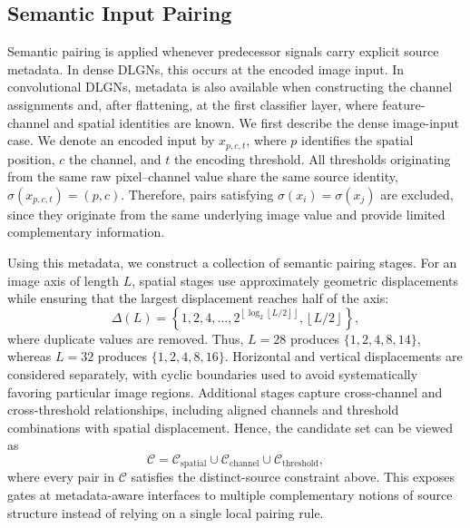 \subsection{Semantic Input Pairing}
\label{sec:semantic}

Semantic pairing is applied whenever predecessor signals carry explicit
source metadata. In dense DLGNs, this occurs at the encoded image input. In
convolutional DLGNs, metadata is also available when constructing the
channel assignments and, after flattening, at the first classifier layer,
where feature-channel and spatial identities are known. We first describe
the dense image-input case. We denote an encoded input by $x_{p,c,t}$, where
$p$ identifies the spatial position, $c$ the channel, and $t$ the encoding
threshold. All thresholds originating from the same raw pixel--channel value
share the same source identity, $\sigma(x_{p,c,t})=(p,c)$. Therefore, pairs
satisfying $\sigma(x_i)=\sigma(x_j)$ are excluded, since they originate from
the same underlying image value and provide limited complementary
information.

Using this metadata, we construct a collection of semantic pairing stages.
For an image axis of length $L$, spatial stages use approximately geometric
displacements while ensuring that the largest displacement reaches half of
the axis:
%
\begin{equation}
\Delta(L)=
\left\{
1,2,4,\ldots,
2^{\left\lfloor\log_2 \left\lfloor L/2\right\rfloor\right\rfloor},
\left\lfloor L/2\right\rfloor
\right\},
\label{eq:semantic_stride}
\end{equation}
%
where duplicate values are removed. Thus, $L=28$ produces
$\{1,2,4,8,14\}$, whereas $L=32$ produces $\{1,2,4,8,16\}$.
Horizontal and vertical displacements are considered separately, with cyclic
boundaries used to avoid systematically favoring particular image regions.
Additional stages capture cross-channel and cross-threshold relationships,
including aligned channels and threshold combinations with spatial
displacement. Hence, the candidate set can be viewed as
%
\begin{equation}
\mathcal{C}
=
\mathcal{C}_{\mathrm{spatial}}
\cup
\mathcal{C}_{\mathrm{channel}}
\cup
\mathcal{C}_{\mathrm{threshold}},
\label{eq:semantic_candidates}
\end{equation}
%
where every pair in $\mathcal{C}$ satisfies the distinct-source constraint
above. This exposes gates at metadata-aware interfaces to multiple
complementary notions of source structure instead of relying on a single
local pairing rule.

